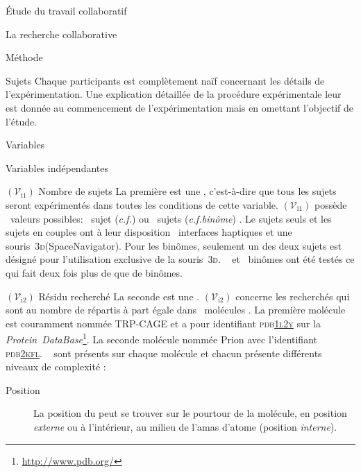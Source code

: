 \documentclass[myfrancais]{mythesis}
\newcommand{\mynum}[1]{\nombre{#1}}
\newcommand{\myvar}[2]{$\left(\mathcal{V}_{\mathrm{#1}#2}\right)$\xspace}
\newcommand{\myvari}[1]{\myvar{i}{#1}}
\newcommand{\myPDB}{\textsc{pdb}\xspace}
\newcommand{\myPDBbase}{\emph{Protein~DataBase}\xspace}
\newcommand{\myPDBlink}[2]{\href{#1}{\textsc{\MakeLowercase{#2}}}}
\newcommand{\TRPCAGE}{TRP-CAGE\xspace}
\newcommand{\Prion}{Prion\xspace}
\newcommand{\myemph}[1]{\emph{#1}}
\newcommand{\myThreeD}{\textsc{3d}\xspace}
\newcommand{\myregistered}{\textsuperscript{\textregistered}}
\newcommand{\mySpaceNavigator}{SpaceNavigator\myregistered\xspace}
\newcommand{\mycf}{\textit{c.f.}\xspace}
\begin{document}
\begin{mypart}{Étude du travail collaboratif}
\begin{mychapter}{La recherche collaborative}
\begin{mysection}{Méthode}
\begin{mysubsection}{Sujets}
					Chaque participants est complètement naïf concernant les détails de l'expérimentation.
					Une explication détaillée de la procédure expérimentale leur est donnée au commencement de l'expérimentation mais en omettant l'objectif de l'étude.
				\end{mysubsection}
				\begin{mysubsection}{Variables}
					\begin{mysubsubsection}{Variables indépendantes}
						\begin{myparagraph}{\myvari{1} Nombre de sujets}
							La première  est une , c'est-à-dire que tous les sujets seront expérimentés dans toutes les conditions de cette variable.
							\myvari{1} possède \mynum{2}~valeurs possibles: \og \mynum{1}~sujet (\mycf \myemph{}) \fg ou \og \mynum{2}~sujets (\mycf \myemph{binôme}) \fg.
							Le sujets seuls et les sujets en couples ont à leur disposition \mynum{2}~interfaces haptiques et une souris~\myThreeD (\mySpaceNavigator).
							Pour les binômes, seulement un des deux sujets est désigné pour l'utilisation exclusive de la souris~\myThreeD.
							\mynum{24}~ et \mynum{12}~binômes ont été testés ce qui fait deux fois plus de  que de binômes.
						\end{myparagraph}
						\begin{myparagraph}{\myvari{2} Résidu recherché}
							La seconde  est une .
							\myvari{2} concerne les  recherchés qui sont au nombre de \mynum{10} répartis à part égale dans \mynum{2}~molécules .
							La première molécule est couramment nommée \TRPCAGE {} et a pour identifiant \myPDB \myPDBlink{http://www.rcsb.org/pdb/explore/explore.do?structureId=1L2Y}{1L2Y} sur la \myPDBbase\footnote{\url{http://www.pdb.org/}}.
							La seconde molécule nommée \Prion {} avec l'identifiant \myPDB \myPDBlink{http://www.rcsb.org/pdb/explore/explore.do?structureId=2KFL}{2KFL}.
							\mynum{5}~ sont présents sur chaque molécule  et chacun présente différents niveaux de complexité  :
							\begin{description}
								\item[Position] La position du  peut se trouver sur le pourtour de la molécule, en position \myemph{externe} ou à l'intérieur, au milieu de l'amas d'atome (position \myemph{interne}).

\end{description}
\end{myparagraph}
\end{mysubsubsection}
\end{mysubsection}
\end{mysection}
\end{mychapter}
\end{mypart}
\end{document}

